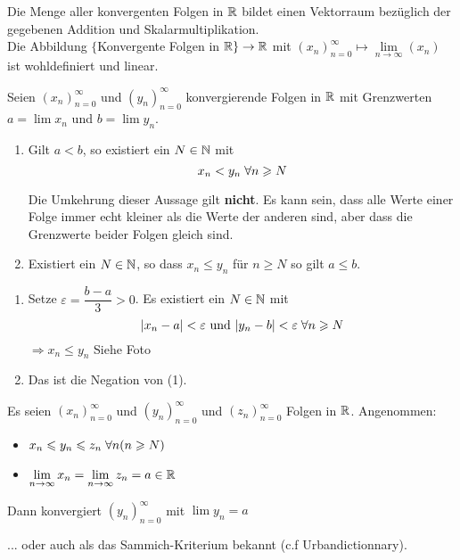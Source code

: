 \documentclass[main.tex]{subfiles}
\begin{document}
\begin{Korollar}
  Die Menge aller konvergenten Folgen in $\mathbb{R}$ bildet einen Vektorraum bezüglich der gegebenen Addition und Skalarmultiplikation.\\
  Die Abbildung $\{$Konvergente Folgen in $\mathbb{R}\} \to \mathbb{R}$ mit $(x_n)_{n=0}^\infty \mapsto \lim \limits_{n \to \infty} (x_n)$ ist wohldefiniert und linear.
\end{Korollar}

\begin{Theorem}
  Seien $(x_n)_{n=0}^\infty$ und $(y_n)_{n=0}^\infty$ konvergierende Folgen in $\mathbb{R}$ mit Grenzwerten $a = \lim x_n$ und $b = \lim y_n$.
  \begin{enumerate}
    \item Gilt $a < b$, so existiert ein $N \in \mathbb{N}$ mit
      $$x_n < y_n \;\forall n \geqslant N$$
      \begin{Bemerkung}
        Die Umkehrung dieser Aussage gilt \textbf{nicht}. Es kann sein, dass alle Werte einer Folge immer echt kleiner als die Werte der anderen sind, aber dass die Grenzwerte beider Folgen gleich sind.
      \end{Bemerkung}
    \item Existiert ein $N \in \mathbb{N}$, so dass $x_n \leq y_n$ für $n \geq N$ so gilt $a \leq b$.
  \end{enumerate}
\end{Theorem}
\begin{Beweis}
  \begin{enumerate}
    \item Setze $\varepsilon = \dfrac{b-a}{3} > 0$. Es existiert ein $N \in \mathbb{N}$ mit
      $$|x_n - a| < \varepsilon \text{ und } |y_n - b| < \varepsilon \;\forall n \geqslant N$$
      $\Rightarrow x_n \leq y_n$ Siehe Foto
    \item Das ist die Negation von (1).
  \end{enumerate}
\end{Beweis}

\begin{Lemma}
  Es seien $(x_n)_{n=0}^\infty$ und $(y_n)_{n=0}^\infty$ und $(z_n)_{n=0}^\infty$ Folgen in $\mathbb{R}$. Angenommen:
  \begin{itemize}
    \item $x_n \leqslant y_n \leqslant z_n \;\forall n (n \geqslant N)$
    \item $\lim \limits_{n \to \infty} x_n = \lim \limits_{n \to \infty} z_n = a \in \mathbb{R}$
  \end{itemize}
  Dann konvergiert $(y_n)_{n=0}^\infty$ mit $\lim y_n = a$
\end{Lemma}
... oder auch als das Sammich-Kriterium bekannt (c.f Urbandictionnary).
\end{document}

